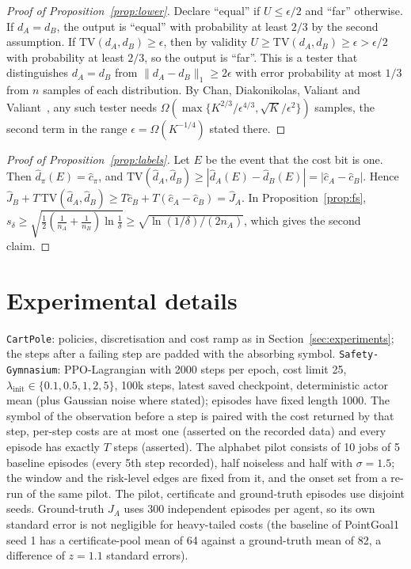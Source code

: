\documentclass{article}
\newcommand{\TV}{\mathrm{TV}}
\begin{document}
\begin{proof}[Proof of Proposition~\ref{prop:lower}]
Declare ``equal'' if $U\le\epsilon/2$ and ``far'' otherwise. If $d_A=d_B$, the output is ``equal'' with probability at least $2/3$ by the second assumption. If $\TV(d_A,d_B)\ge\epsilon$, then by validity $U\ge\TV(d_A,d_B)\ge\epsilon>\epsilon/2$ with probability at least $2/3$, so the output is ``far''. This is a tester that distinguishes $d_A=d_B$ from $\|d_A-d_B\|_1\ge2\epsilon$ with error probability at most $1/3$ from $n$ samples of each distribution. By Chan, Diakonikolas, Valiant and Valiant~\citep{chan2014closeness}, any such tester needs $\Omega(\max\{K^{2/3}/\epsilon^{4/3},\sqrt K/\epsilon^2\})$ samples, the second term in the range $\epsilon=\Omega(K^{-1/4})$ stated there.
\end{proof}

\begin{proof}[Proof of Proposition~\ref{prop:labels}]
Let $E$ be the event that the cost bit is one. Then $\hat d_\pi(E)=\hat c_\pi$, and $\TV(\hat d_A,\hat d_B)\ge|\hat d_A(E)-\hat d_B(E)|=|\hat c_A-\hat c_B|$. Hence $\hat J_B+T\,\TV(\hat d_A,\hat d_B)\ge T\hat c_B+T(\hat c_A-\hat c_B)=\hat J_A$. In Proposition~\ref{prop:fs}, $s_\delta\ge\sqrt{\tfrac12(\tfrac1{n_A}+\tfrac1{n_B})\ln\tfrac1\delta}\ge\sqrt{\ln(1/\delta)/(2n_A)}$, which gives the second claim.
\end{proof}

\section{Experimental details}
\label{app:details}
\texttt{CartPole}: policies, discretisation and cost ramp as in Section~\ref{sec:experiments}; the steps after a failing step are padded with the absorbing symbol. \texttt{Safety-Gymnasium}: PPO-Lagrangian with 2000 steps per epoch, cost limit 25, $\lambda_{\text{init}}\in\{0.1,0.5,1,2,5\}$, 100k steps, latest saved checkpoint, deterministic actor mean (plus Gaussian noise where stated); episodes have fixed length 1000. The symbol of the observation before a step is paired with the cost returned by that step, per-step costs are at most one (asserted on the recorded data) and every episode has exactly $T$ steps (asserted). The alphabet pilot consists of 10 jobs of 5 baseline episodes (every 5th step recorded), half noiseless and half with $\sigma=1.5$; the window and the risk-level edges are fixed from it, and the onset set from a re-run of the same pilot. The pilot, certificate and ground-truth episodes use disjoint seeds. Ground-truth $J_A$ uses 300 independent episodes per agent, so its own standard error is not negligible for heavy-tailed costs (the baseline of PointGoal1 seed 1 has a certificate-pool mean of 64 against a ground-truth mean of 82, a difference of $z=1.1$ standard errors).
\end{document}
